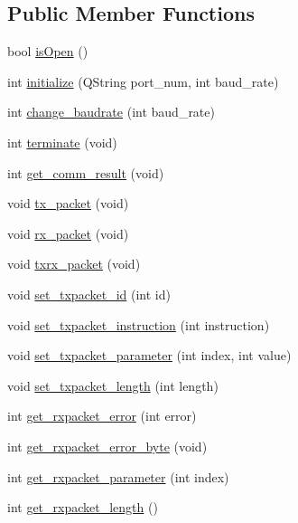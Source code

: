 \subsection*{Public Member Functions}
\begin{DoxyCompactItemize}
\item 
bool \hyperlink{classdynamixel_a5ae4b2c6eb4c91f404f973ee8e6a1914}{is\+Open} ()
\item 
int \hyperlink{classdynamixel_a87960244d5846ae7583e37d2407eb61e}{initialize} (Q\+String port\+\_\+num, int baud\+\_\+rate)
\item 
int \hyperlink{classdynamixel_a7554c7889896e29e11a62027d89f3fdf}{change\+\_\+baudrate} (int baud\+\_\+rate)
\item 
int \hyperlink{classdynamixel_a92ea074ed1c1a9cf29e039f8c425f01a}{terminate} (void)
\item 
int \hyperlink{classdynamixel_a80155fe1814322c679abef987e349939}{get\+\_\+comm\+\_\+result} (void)
\item 
void \hyperlink{classdynamixel_a479187cd8940c16dd4374eb5be22b888}{tx\+\_\+packet} (void)
\item 
void \hyperlink{classdynamixel_aa26d2d2dff768563a1cb1480aa061608}{rx\+\_\+packet} (void)
\item 
void \hyperlink{classdynamixel_aebfc569c6b1eb0b98f8c385f0f921fc0}{txrx\+\_\+packet} (void)
\item 
void \hyperlink{classdynamixel_a84e24c72c3e5be866f8b28c2e5bd1d95}{set\+\_\+txpacket\+\_\+id} (int id)
\item 
void \hyperlink{classdynamixel_a209a43f983f214323b6f0a627d5e8c13}{set\+\_\+txpacket\+\_\+instruction} (int instruction)
\item 
void \hyperlink{classdynamixel_a2c3d31bbbed70a69918e9972a620384b}{set\+\_\+txpacket\+\_\+parameter} (int index, int value)
\item 
void \hyperlink{classdynamixel_a829278f48e21c810b172eb8cab3b86de}{set\+\_\+txpacket\+\_\+length} (int length)
\item 
int \hyperlink{classdynamixel_a1bbabb82d7a2764cc4b0b351dd0019e5}{get\+\_\+rxpacket\+\_\+error} (int error)
\item 
int \hyperlink{classdynamixel_a6e62341ef9f51b6e152e769bd7be9d75}{get\+\_\+rxpacket\+\_\+error\+\_\+byte} (void)
\item 
int \hyperlink{classdynamixel_a68b5fa99719a9aec0734ecfb0635503b}{get\+\_\+rxpacket\+\_\+parameter} (int index)
\item 
int \hyperlink{classdynamixel_ae9cc18fdeda8329f68fa0f2f0a7a9aba}{get\+\_\+rxpacket\+\_\+length} ()

\end{DoxyCompactItemize}
